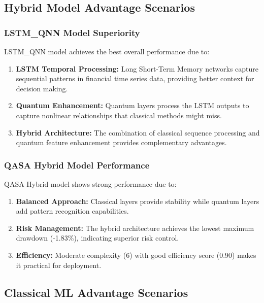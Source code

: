 \documentclass[12pt,a4paper]{article}
\begin{document}
\subsection{Hybrid Model Advantage Scenarios}

\subsubsection{LSTM\_QNN Model Superiority}

LSTM\_QNN model achieves the best overall performance due to:

\begin{enumerate}
    \item \textbf{LSTM Temporal Processing:} Long Short-Term Memory networks capture sequential patterns in financial time series data, providing better context for decision making.
    
    \item \textbf{Quantum Enhancement:} Quantum layers process the LSTM outputs to capture nonlinear relationships that classical methods might miss.
    
    \item \textbf{Hybrid Architecture:} The combination of classical sequence processing and quantum feature enhancement provides complementary advantages.
\end{enumerate}

\subsubsection{QASA Hybrid Model Performance}

QASA Hybrid model shows strong performance due to:

\begin{enumerate}
    \item \textbf{Balanced Approach:} Classical layers provide stability while quantum layers add pattern recognition capabilities.
    
    \item \textbf{Risk Management:} The hybrid architecture achieves the lowest maximum drawdown (-1.83\%), indicating superior risk control.
    
    \item \textbf{Efficiency:} Moderate complexity (6) with good efficiency score (0.90) makes it practical for deployment.
\end{enumerate}

\subsection{Classical ML Advantage Scenarios}
\end{document}
